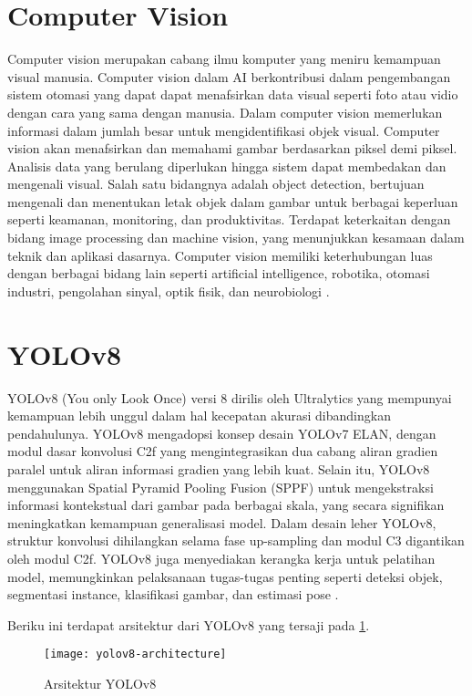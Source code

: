 \section{Computer Vision}
Computer vision merupakan cabang ilmu komputer yang meniru kemampuan visual manusia. Computer vision dalam AI berkontribusi dalam pengembangan sistem otomasi yang dapat dapat menafsirkan data visual seperti foto atau vidio dengan cara yang sama dengan manusia. Dalam computer vision memerlukan informasi dalam jumlah besar untuk mengidentifikasi objek visual. Computer vision akan menafsirkan dan memahami gambar berdasarkan piksel demi piksel. Analisis data yang berulang diperlukan hingga sistem dapat membedakan dan mengenali visual. Salah satu bidangnya adalah object detection, bertujuan mengenali dan menentukan letak objek dalam gambar untuk berbagai keperluan seperti keamanan, monitoring, dan produktivitas.  Terdapat keterkaitan dengan bidang image processing dan machine vision, yang menunjukkan kesamaan dalam teknik dan aplikasi dasarnya. Computer vision memiliki keterhubungan luas dengan berbagai bidang lain seperti artificial intelligence, robotika, otomasi industri, pengolahan sinyal, optik fisik, dan neurobiologi \cite{anggraeni2004sistem}.

\section{YOLOv8}
YOLOv8 (You only Look Once) versi 8 dirilis oleh Ultralytics yang mempunyai kemampuan lebih unggul dalam hal kecepatan  akurasi dibandingkan pendahulunya. YOLOv8 mengadopsi konsep desain YOLOv7 ELAN, dengan modul dasar konvolusi C2f yang mengintegrasikan dua cabang aliran gradien paralel untuk aliran informasi gradien yang lebih kuat. Selain itu, YOLOv8 menggunakan Spatial Pyramid Pooling Fusion (SPPF) untuk mengekstraksi informasi kontekstual dari gambar pada berbagai skala, yang secara signifikan meningkatkan kemampuan generalisasi model. Dalam desain leher YOLOv8, struktur konvolusi dihilangkan selama fase up-sampling dan modul C3 digantikan oleh modul C2f. YOLOv8 juga menyediakan kerangka kerja untuk pelatihan model, memungkinkan pelaksanaan tugas-tugas penting seperti deteksi objek, segmentasi instance, klasifikasi gambar, dan estimasi pose \cite{bai2023automated}.


Beriku ini terdapat  arsitektur dari YOLOv8 yang tersaji pada \cref{fig:yolov8}.
\begin{figure}[H]
	\centering
	\texttt{[image: yolov8-architecture]}
	\caption{Arsitektur YOLOv8}
	\label{fig:yolov8}
\end{figure}

